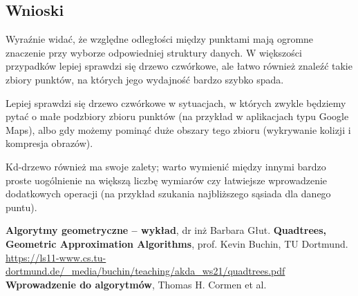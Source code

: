 \documentclass[12pt]{scrartcl}
\begin{document}
\subsection{Wnioski}
Wyraźnie widać, że względne odległości między punktami mają ogromne znaczenie przy wyborze odpowiedniej struktury danych. W większości przypadków lepiej sprawdzi się drzewo czwórkowe, ale łatwo również znaleźć takie zbiory punktów, na których jego wydajność bardzo szybko spada.

Lepiej sprawdzi się drzewo czwórkowe w sytuacjach, w których zwykle będziemy pytać o małe podzbiory zbioru punktów (na przykład w aplikacjach typu Google Maps), albo gdy możemy pominąć duże obszary tego zbioru (wykrywanie kolizji i kompresja obrazów).

Kd-drzewo również ma swoje zalety; warto wymienić między innymi bardzo proste uogólnienie na większą liczbę wymiarów czy łatwiejsze wprowadzenie dodatkowych operacji (na przykład szukania najbliższego sąsiada dla danego puntu).



\begin{thebibliography}{9}
     \textbf{Algorytmy geometryczne -- wykład}, dr inż Barbara Głut.
     \textbf{Quadtrees, Geometric Approximation Algorithms}, prof. Kevin Buchin, TU Dortmund.
        \url{https://ls11-www.cs.tu-dortmund.de/_media/buchin/teaching/akda_ws21/quadtrees.pdf}
         \textbf{Wprowadzenie do algorytmów}, Thomas H. Cormen et al.
\end{thebibliography}
\end{document}
